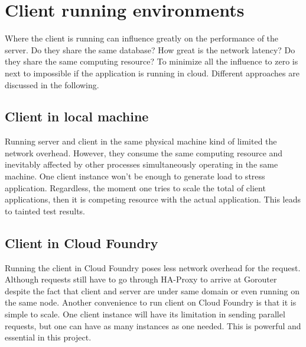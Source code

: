 \section{ Client running environments}
Where the client is running can influence greatly on the performance of the server. Do they share the same database? How great is the network latency? Do they share the same computing resource? To minimize all the influence to zero is next to impossible if the application is running in cloud. Different approaches are discussed in the following. 

\subsection{Client in local machine}
Running server and client in the same physical machine kind of limited the network overhead. However, they consume the same computing resource and inevitably affected by other processes simultaneously operating in the same machine. One client instance won't be enough to generate load to stress application. Regardless, the moment one tries to scale the total of client applications, then it is competing resource with the actual application. This leads to tainted test results.  
\subsection{Client in Cloud Foundry}
Running the client in Cloud Foundry poses less network overhead for the request. Although requests still have to go through HA-Proxy to arrive at Gorouter despite the fact that client and server are under same domain or even running on the same node. Another convenience to run client on Cloud Foundry is that it is simple to scale. One client instance will have its limitation in sending parallel requests, but one can have as many instances as one needed. This is powerful and essential in this project. 


